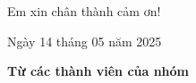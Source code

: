 \documentclass[main.tex]{subfiles}
\begin{document}




\vspace{6pt}
\begin{flushright} Em xin chân thành cảm ơn! \end{flushright}

\hspace{12cm}Ngày 14 tháng 05 năm 2025

\vspace{2cm}

\hspace{11.75cm}\textbf{Từ các thành viên của nhóm}
\end{document}
